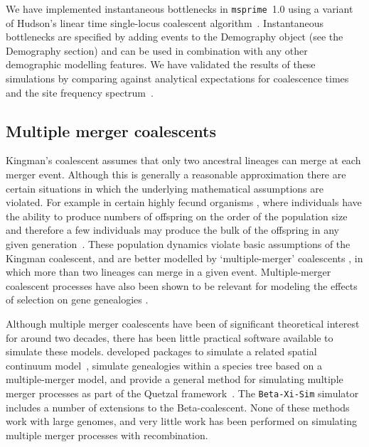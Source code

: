 \documentclass{article}
\newcommand{\msprime}[0]{\texttt{msprime}}
\begin{document}
We have implemented instantaneous bottlenecks in \msprime~1.0
using a variant of Hudson's linear time single-locus coalescent
algorithm~\citep{hudson1990gene}. Instantaneous bottlenecks are specified
by adding events to the Demography object (see the Demography section)
and can be used in combination with any other demographic modelling
features. We have validated the results of these simulations by comparing
against analytical expectations for coalescence times and the
site frequency spectrum~\citep{bunnefeld2015inferring}.

\subsection*{Multiple merger coalescents}

Kingman's coalescent assumes that only two ancestral lineages can merge at
each merger event. Although this is generally a reasonable approximation there
are certain situations in which the underlying mathematical assumptions are
violated. For example in certain highly fecund organisms
\citep{hedgecock_94,B94,HP11,A04,irwin16}, where individuals have the ability
to produce numbers of offspring on the order of the population size and
therefore a few individuals may produce the bulk of the offspring in any given
generation~\citep{hedgecock_94}. These population dynamics violate basic
assumptions of the Kingman coalescent, and are better modelled by
`multiple-merger' coalescents \citep{DK99,P99,S99,S00,MS01}, in which more than
two lineages can merge in a given event. Multiple-merger coalescent processes
have also been shown to be relevant for modeling the effects of selection on
gene genealogies \citep{Gillespie909,DS04}.

Although multiple merger coalescents have been of significant theoretical
interest for around two decades, there has been little practical software
available to simulate these models.
\cite{kelleher2013coalescent,kelleher2014coalescent} developed packages to
simulate a related spatial continuum model~\citep{barton2010new},
\cite{zhu2015hybrid} simulate genealogies within a species tree
based on a multiple-merger model, and
\cite{becheler2020occupancy} provide a general method for simulating
multiple merger processes
as part of the Quetzal framework~\citep{becheler2019quetzal}.
The \texttt{Beta-Xi-Sim} simulator~\citep{koskela2018multi,koskela2019robust}
includes a number of extensions to the Beta-coalescent.
None of these methods work with large genomes, and very little work
has been performed on simulating multiple merger processes with recombination.
\end{document}
